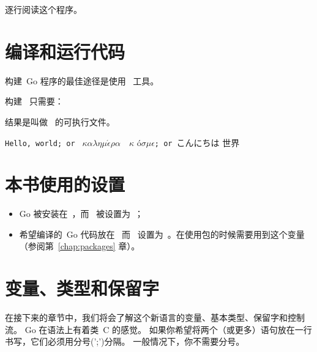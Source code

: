 
逐行阅读这个程序。
\showremarks

\section{编译和运行代码}
\label{sec:building a program}
构建~Go 程序的最佳途径是使用~ 工具。

构建~ 只需要：
\begin{display}
\pr {}
\end{display}
结果是叫做~ 的可执行文件。

\begin{display}
\pr {}
\end{display}
\vspace{-3.0ex}
\texttt{Hello, world; or }%
\begin{math}\kappa\alpha\lambda\eta\mu\acute{\epsilon}\rho\alpha\hspace{1em}\kappa\end{math}%
\'o\begin{math} \sigma\mu\epsilon\end{math}\texttt{; or }こんにちは 世界
\ \newline
\ \newline

\section{本书使用的设置}
\label{sec:settings_used}
\begin{itemize}                            
\item Go 被安装在~，而~ 被设置为~；
\item 希望编译的~Go 代码放在~ 
而~ 设置为~。在使用包的时候需要用到这个变量（参阅第~\ref{chap:packages} 章）。
\end{itemize}

\section{变量、类型和保留字}
\label{sec:vars}
在接下来的章节中，我们将会了解这个新语言的变量、基本类型、保留字和控制流。
Go 在语法上有着类~C 的感觉。
如果你希望将两个（或更多）语句放在一行书写，它们必须用分号(';')分隔。
一般情况下，你不需要分号。

